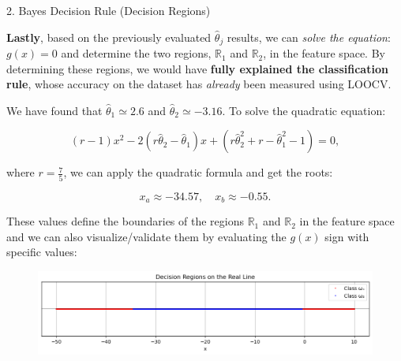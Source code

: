 \documentclass[aspectratio=169,xcolor=dvipsnames]{beamer}
\begin{document}
\begin{frame}{2. Bayes Decision Rule (Decision Regions)}

    \textbf{Lastly}, based on the previously evaluated $\hat{\theta}_j$ results, we can \textit{solve the equation}: $g(x) = 0$ and determine the two regions, $\mathbb{R}_1$ and $\mathbb{R}_2$, in the feature space. By determining these regions, we would have \textbf{fully explained the classification rule}, whose accuracy on the dataset has \textit{already} been measured using LOOCV.

    We have found that $\hat{\theta}_1 \simeq 2.6$ and $\hat{\theta}_2 \simeq -3.16$. To solve the quadratic equation:

    \vspace{-10pt}
    
    $$ (r-1)x^2 - 2(r\hat{\theta}_2 - \hat{\theta}_1)x + (r\hat{\theta}_2^2 + r - \hat{\theta}_1^2 - 1) = 0, $$

    \vspace{-5pt}
    
    where $r = \frac{7}{5}$, we can apply the quadratic formula and get the roots:

    \vspace{-15pt}
    
    $$ x_a \approx −34.57, \quad x_b \approx −0.55.$$

    \vspace{-7pt}
    
    These values define the boundaries of the regions $\mathbb{R}_1$ and $\mathbb{R}_2$ in the feature space and we can also visualize/validate them by evaluating the $g(x)$ sign with specific values:

    \vspace{-5pt}

    \begin{figure}
        \centering
        \includegraphics[width=0.7\linewidth]{out/plot4_DecisionRegions.png}
        \label{fig:1}
    \end{figure}

\end{frame}

\end{document}
